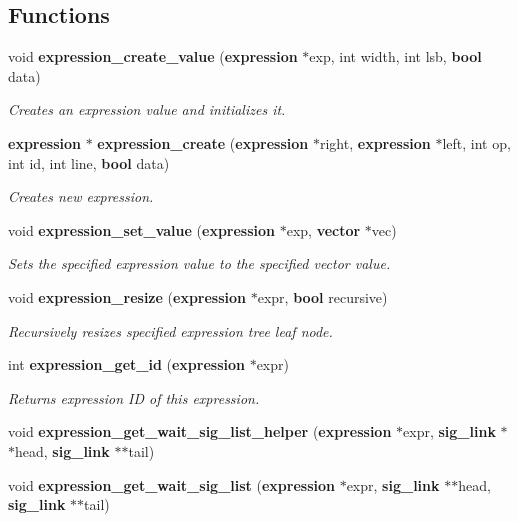 \subsection*{Functions}
\begin{CompactItemize}
\item 
void {\bf expression\_\-create\_\-value} ({\bf expression} $\ast$exp, int width, int lsb, {\bf bool} data)
\begin{CompactList}\small\item\em Creates an expression value and initializes it. \item\end{CompactList}\item 
{\bf expression} $\ast$ {\bf expression\_\-create} ({\bf expression} $\ast$right, {\bf expression} $\ast$left, int op, int id, int line, {\bf bool} data)
\begin{CompactList}\small\item\em Creates new expression. \item\end{CompactList}\item 
void {\bf expression\_\-set\_\-value} ({\bf expression} $\ast$exp, {\bf vector} $\ast$vec)
\begin{CompactList}\small\item\em Sets the specified expression value to the specified vector value. \item\end{CompactList}\item 
void {\bf expression\_\-resize} ({\bf expression} $\ast$expr, {\bf bool} recursive)
\begin{CompactList}\small\item\em Recursively resizes specified expression tree leaf node. \item\end{CompactList}\item 
int {\bf expression\_\-get\_\-id} ({\bf expression} $\ast$expr)
\begin{CompactList}\small\item\em Returns expression ID of this expression. \item\end{CompactList}\item 
void {\bf expression\_\-get\_\-wait\_\-sig\_\-list\_\-helper} ({\bf expression} $\ast$expr, {\bf sig\_\-link} $\ast$$\ast$head, {\bf sig\_\-link} $\ast$$\ast$tail)
\item 
void {\bf expression\_\-get\_\-wait\_\-sig\_\-list} ({\bf expression} $\ast$expr, {\bf sig\_\-link} $\ast$$\ast$head, {\bf sig\_\-link} $\ast$$\ast$tail)

\end{CompactItemize}
